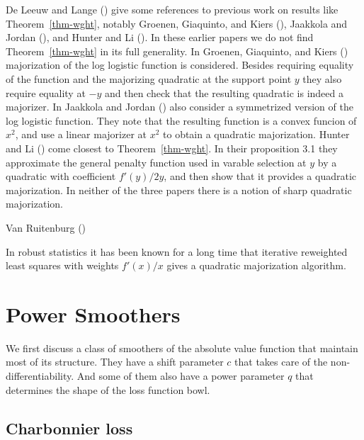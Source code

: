 \documentclass[
  12pt,
  letterpaper,
  DIV=11,
  numbers=noendperiod]{scrartcl}
\newcommand{\sectionbreak}{\pagebreak}
\theoremstyle{plain}
\theoremstyle{remark}
\begin{document}
De Leeuw and Lange () give some
references to previous work on results like Theorem~\ref{thm-wght},
notably Groenen, Giaquinto, and Kiers
(), Jaakkola and Jordan
(), and Hunter and Li
(). In these earlier papers we do not
find Theorem~\ref{thm-wght} in its full generality. In Groenen,
Giaquinto, and Kiers ()
majorization of the log logistic function is considered. Besides
requiring equality of the function and the majorizing quadratic at the
support point \(y\) they also require equality at \(-y\) and then check
that the resulting quadratic is indeed a majorizer. In Jaakkola and
Jordan () also consider a
symmetrized version of the log logistic function. They note that the
resulting function is a convex funcion of \(x^2\), and use a linear
majorizer at \(x^2\) to obtain a quadratic majorization. Hunter and Li
() come closest to
Theorem~\ref{thm-wght}. In their proposition 3.1 they approximate the
general penalty function used in varable selection at \(y\) by a
quadratic with coefficient \(f'(y)/2y\), and then show that it provides
a quadratic majorization. In neither of the three papers there is a
notion of sharp quadratic majorization.

Van Ruitenburg ()

In robust statistics it has been known for a long time that iterative
reweighted least squares with weights \(f'(x)/x\) gives a quadratic
majorization algorithm.

\sectionbreak

\section{Power Smoothers}\label{power-smoothers}

We first discuss a class of smoothers of the absolute value function
that maintain most of its structure. They have a shift parameter \(c\)
that takes care of the non-differentiability. And some of them also have
a power parameter \(q\) that determines the shape of the loss function
bowl.

\subsection{Charbonnier loss}\label{charbonnier-loss}
\end{document}
